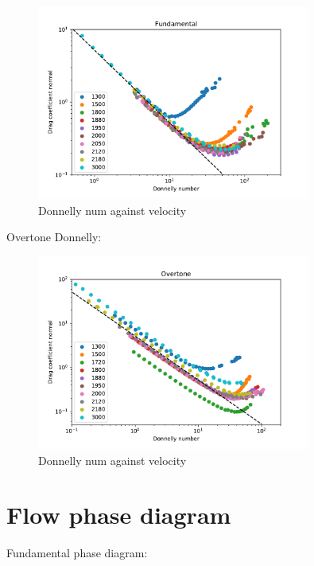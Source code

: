 \begin{figure}[h]
	\centering
	\includegraphics[width=0.8\textwidth]{graphics/results/fund-donnelly}
	\caption{Donnelly num against velocity}
	\label{fund_donnelly}
\end{figure}

Overtone Donnelly:

\begin{figure}[h]
	\centering
	\includegraphics[width=0.8\textwidth]{graphics/results/over-donnelly}
	\caption{Donnelly num against velocity}
	\label{over_donnelly}
\end{figure}

\section{Flow phase diagram}

Fundamental phase diagram:

